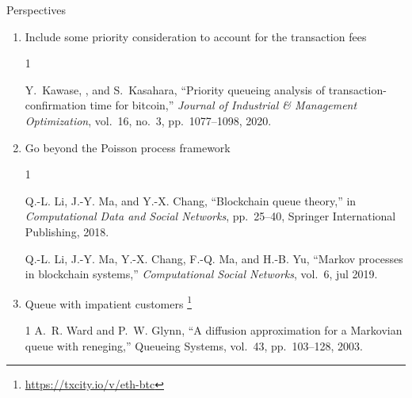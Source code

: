 \documentclass{beamer}
\newcommand\blfootnote[1]{%
  \begingroup
  \renewcommand\thefootnote{}\footnote{#1}%
  \addtocounter{footnote}{-1}%
  \endgroup
}
\begin{document}
\begin{frame}{Perspectives}
\begin{enumerate}
  \item  Include some priority consideration to account for the transaction fees 
  \tiny 
  \begin{thebibliography}{1}

Y.~Kawase, , and S.~Kasahara, ``Priority queueing analysis of
  transaction-confirmation time for bitcoin,'' {\em Journal of Industrial {\&}
  Management Optimization}, vol.~16, no.~3, pp.~1077--1098, 2020.

\end{thebibliography}

  \item \normalsize Go beyond the Poisson process framework
  \tiny
  \begin{thebibliography}{1}

Q.-L. Li, J.-Y. Ma, and Y.-X. Chang, ``Blockchain queue theory,'' in {\em
  Computational Data and Social Networks}, pp.~25--40, Springer International
  Publishing, 2018.

Q.-L. Li, J.-Y. Ma, Y.-X. Chang, F.-Q. Ma, and H.-B. Yu, ``Markov processes in
  blockchain systems,'' {\em Computational Social Networks}, vol.~6, jul 2019.

\end{thebibliography}

\item \normalsize Queue with impatient customers\blfootnote{\url{https://txcity.io/v/eth-btc}}
  \tiny
  \begin{thebibliography}{1}
  A.~R. Ward and P.~W. Glynn, ``A diffusion approximation for a Markovian queue
  with reneging,'' Queueing Systems, vol.~43, pp.~103--128, 2003.
  \end{thebibliography}
\end{enumerate}

\end{frame}
\end{document}
